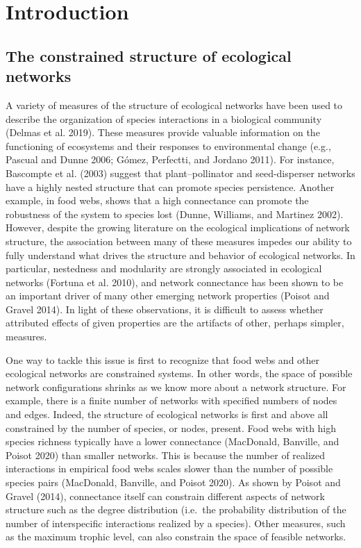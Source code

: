 \documentclass[11pt]{article}
\begin{document}
\clearpage
\linenumbers
\pagestyle{normal}

\hypertarget{introduction}{%
\section{Introduction}\label{introduction}}

\hypertarget{the-constrained-structure-of-ecological-networks}{%
\subsection{The constrained structure of ecological
networks}\label{the-constrained-structure-of-ecological-networks}}

A variety of measures of the structure of ecological networks have been
used to describe the organization of species interactions in a
biological community (Delmas et al. 2019). These measures provide
valuable information on the functioning of ecosystems and their
responses to environmental change (e.g., Pascual and Dunne 2006; Gómez,
Perfectti, and Jordano 2011). For instance, Bascompte et al. (2003)
suggest that plant--pollinator and seed-disperser networks have a highly
nested structure that can promote species persistence. Another example,
in food webs, shows that a high connectance can promote the robustness
of the system to species lost (Dunne, Williams, and Martinez 2002).
However, despite the growing literature on the ecological implications
of network structure, the association between many of these measures
impedes our ability to fully understand what drives the structure and
behavior of ecological networks. In particular, nestedness and
modularity are strongly associated in ecological networks (Fortuna et
al. 2010), and network connectance has been shown to be an important
driver of many other emerging network properties (Poisot and Gravel
2014). In light of these observations, it is difficult to assess whether
attributed effects of given properties are the artifacts of other,
perhaps simpler, measures.

One way to tackle this issue is first to recognize that food webs and
other ecological networks are constrained systems. In other words, the
space of possible network configurations shrinks as we know more about a
network structure. For example, there is a finite number of networks
with specified numbers of nodes and edges. Indeed, the structure of
ecological networks is first and above all constrained by the number of
species, or nodes, present. Food webs with high species richness
typically have a lower connectance (MacDonald, Banville, and Poisot
2020) than smaller networks. This is because the number of realized
interactions in empirical food webs scales slower than the number of
possible species pairs (MacDonald, Banville, and Poisot 2020). As shown
by Poisot and Gravel (2014), connectance itself can constrain different
aspects of network structure such as the degree distribution (i.e.~the
probability distribution of the number of interspecific interactions
realized by a species). Other measures, such as the maximum trophic
level, can also constrain the space of feasible networks.
\end{document}
